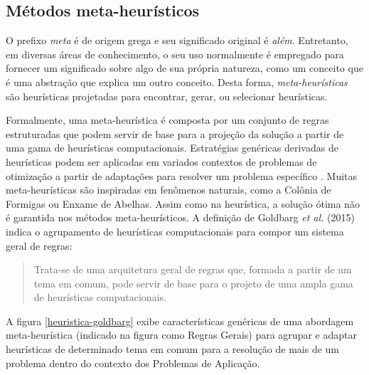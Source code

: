 
\subsection{Métodos meta-heurísticos}\label{metaheuristica}
O prefixo \emph{meta} é de origem grega e seu significado original é \emph{além}. Entretanto, em diversas áreas de conhecimento, o seu uso normalmente é empregado para fornecer um significado sobre algo de sua própria natureza, como um conceito que é uma abstração que explica um outro conceito. Desta forma, \emph{meta-heurísticas} são heurísticas projetadas para encontrar, gerar, ou selecionar heurísticas.

Formalmente, uma meta-heurística é composta por um conjunto de regras estruturadas que podem servir de base para a projeção da solução a partir de uma gama de heurísticas computacionais. Estratégias genéricas derivadas de heurísticas  podem ser aplicadas em variados contextos de problemas de otimização a partir de adaptações para resolver um problema específico \cite{maxwell}. Muitas meta-heurísticas são inspiradas em fenômenos naturais, como a Colônia de Formigas ou Enxame de Abelhas. Assim como na heurística, a solução ótima não é garantida nos métodos meta-heurísticos. A definição de Goldbarg \emph{et al.} (2015) indica o agrupamento de heurísticas computacionais para compor um sistema geral de regras: 

\begin{quote}
Trata-se de uma arquitetura geral de regras que, formada a partir de um tema em comum, pode servir de base para o projeto de uma ampla gama de heurísticas computacionais.
\end{quote}

A figura \ref{heuristica-goldbarg} exibe características genéricas de uma abordagem meta-heurística (indicado na figura como Regras Gerais) para agrupar e adaptar heurísticas de determinado tema em comum para a resolução de mais de um problema dentro do contexto dos Problemas de Aplicação.

